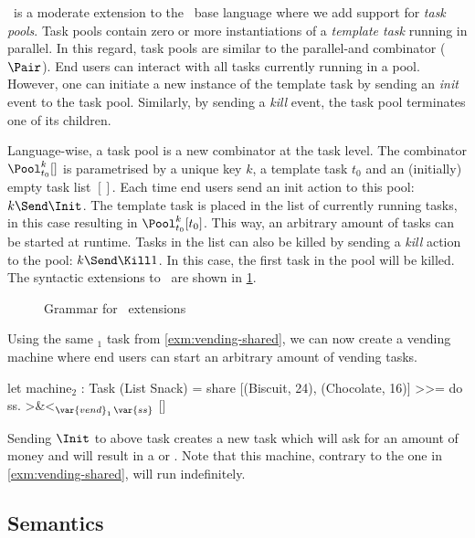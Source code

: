 \DYNTOPHAT\ is a moderate extension to the \TOPHAT\ base language where we add support for \emph{task pools}.
Task pools contain zero or more instantiations of a \emph{template task} running in parallel.
In this regard, task pools are similar to the parallel-and combinator ($\Pair$).
End users can interact with all tasks currently running in a pool.
However, one can initiate a new instance of the template task by sending an \emph{init} event to the task pool.
Similarly, by sending a \emph{kill} event, the task pool terminates one of its children.

Language-wise, a task pool is a new combinator at the task level.
The combinator $\Pool^k_{t_0} []$ is parametrised by a unique key $k$, a template task $t_0$ and an (initially) empty task list $[]$.
Each time end users send an init action to this pool: $k\Send\Init$.
The template task is placed in the list of currently running tasks,
in this case resulting in $\Pool^k_{t_0} [t_0]$.
This way, an arbitrary amount of tasks can be started at runtime.
Tasks in the list can also be killed by sending a \emph{kill} action to the pool: $k\Send\Kill1$.
In this case, the first task in the pool will be killed.
The syntactic extensions to \TOPHAT\ are shown in \cref{fig:dynamic-grammar}.

\begin{figure}
  \caption{Grammar for \DYNTOPHAT\ extensions}
  \label{fig:dynamic-grammar}
\end{figure}

\begin{example}
  \label{exm:vending-dynamic}
  Using the same $_1$ task from \cref{exm:vending-shared},
  we can now create a vending machine where end users can start an arbitrary amount of vending tasks.
  \begin{TASK}
    let machine$_2$ : Task (List Snack) =
      share [(Biscuit, 24), (Chocolate, 16)] >>= do ss.
      >&<$_{\var{vend}_1\,\var{ss}}$ []
  \end{TASK}
  Sending $\Init$ to above task creates a new  task
  which will ask for an amount of money and will result in a  or .
  Note that this machine, contrary to the one in \cref{exm:vending-shared}, will run indefinitely.
\end{example}


\subsection{Semantics}

